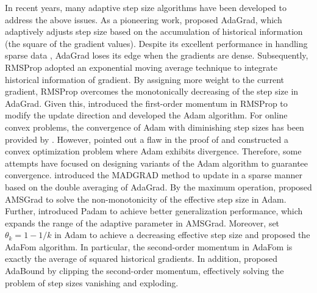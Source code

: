 \documentclass[twoside,11pt]{article}
\begin{document}
\par In recent years, many adaptive step size  algorithms have been developed to address the above issues. As a pioneering work, \citet{duchi2011adaptive} proposed AdaGrad, which adaptively adjusts step size based on the accumulation of historical information (the square of the gradient values). Despite its excellent performance in handling sparse data \citep{dean2012large,pennington2014glove}, AdaGrad loses its edge when the gradients are dense. Subsequently, RMSProp \citep{tieleman2012lecture} adopted an exponential moving average technique to integrate historical information of gradient. By assigning more weight to the current gradient, RMSProp overcomes the monotonically decreasing of the step size in AdaGrad. Given this, \citet{kingma2014adam} introduced the first-order momentum in RMSProp to modify the update direction  and developed the Adam algorithm. For online convex problems, the convergence of Adam with diminishing step sizes has been provided by \citet{kingma2014adam}. However, \citet{reddi2019convergence} pointed out a flaw in the proof of \citet{kingma2014adam} and constructed a convex optimization problem where Adam exhibits divergence. Therefore, some attempts have focused on designing variants of the Adam algorithm to guarantee convergence. \citet{defazio2022adaptivity} introduced the MADGRAD method to update in a sparse manner based on the double averaging of AdaGrad. By the maximum operation, \citet{reddi2019convergence} proposed AMSGrad to solve the non-monotonicity of the effective step size in Adam. Further, \citet{Chen2018ClosingTG} introduced Padam to achieve better generalization performance, which expands the range of the adaptive parameter in AMSGrad. Moreover, \citet{chen2019convergence} set $\theta_{k}=1-1/k$ in Adam to achieve a decreasing effective step size and proposed the AdaFom algorithm. In particular, the second-order momentum in AdaFom is exactly the average of squared historical gradients. In addition, \citet{luo2018adaptive} proposed AdaBound by clipping the second-order momentum, effectively solving the problem of step sizes vanishing and exploding. 
\end{document}
